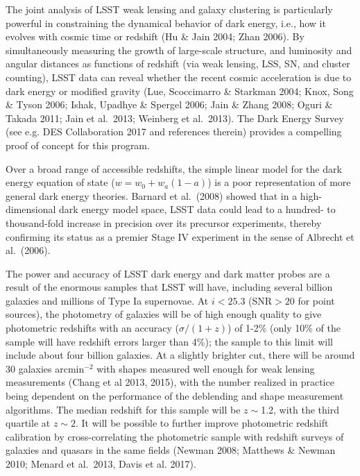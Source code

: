 The joint analysis of LSST weak lensing and galaxy clustering is
particularly powerful in constraining the dynamical behavior of dark
energy, i.e., how it evolves with cosmic time or redshift (Hu \& Jain
2004; Zhan 2006).  By
simultaneously measuring the growth of large-scale structure, and
luminosity and angular distances as functions of redshift (via weak
lensing, LSS, SN, and cluster counting), LSST data can reveal whether
the recent cosmic acceleration is due to dark energy or modified
gravity (Lue, Scoccimarro \& Starkman 2004; Knox, Song \& Tyson 2006;
Ishak, Upadhye \& Spergel 2006; Jain \& Zhang 2008; Oguri \& Takada
2011; Jain et al.~2013; Weinberg et al.~2013). The Dark Energy Survey (see e.g. DES Collaboration 2017 and references therein) provides a compelling proof of concept for this program.

Over a broad range of accessible redshifts, the simple linear model
for the dark energy equation of state ($w = w_0 + w_a(1-a)$) is a poor representation of more
general dark energy theories. Barnard et al.~(2008) showed that in a high-dimensional dark energy model space,
LSST data could lead to a hundred- to thousand-fold increase in precision over its
precursor experiments, thereby confirming its status as
a premier Stage IV experiment in the sense of Albrecht et al.~(2006).

The power and accuracy of LSST dark energy and dark matter probes are
a result of the enormous samples that LSST will have, including
several billion galaxies and millions of Type Ia
supernovae. At $i < 25.3$ (SNR${}>20$ for point sources), the
photometry of galaxies will be of high enough quality to give
photometric redshifts with an accuracy ($\sigma/(1+z)$) of 1-2\% (only
10\% of the sample will have redshift errors larger than 4\%); the
sample to this limit will include about four billion galaxies.  At a
slightly brighter cut, there will be around 30 galaxies arcmin$^{-2}$
with shapes measured well enough for weak lensing measurements (Chang et
al 2013, 2015), with the number realized in practice being dependent on
the performance of the deblending and shape measurement algorithms.
The median redshift for
this sample will be $z\sim$1.2, with the third quartile at $z\sim2$.
It will be possible to further improve photometric redshift calibration
by cross-correlating the photometric sample with redshift surveys of
galaxies and quasars in the same fields (Newman 2008; Matthews \&
Newman 2010; Menard et al.~2013, Davis et al. 2017).


